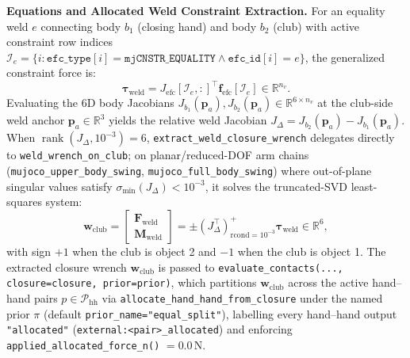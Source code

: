 \documentclass[11pt,a4paper]{article}
\newcommand{\R}{\mathbb{R}}
\begin{document}
\textbf{Equations and Allocated Weld Constraint Extraction.}
For an equality weld $e$ connecting body $b_1$ (closing hand) and body $b_2$ (club) with active constraint row indices $\mathcal{I}_e = \{i : \texttt{efc\_type}[i] = \texttt{mjCNSTR\_EQUALITY} \wedge \texttt{efc\_id}[i] = e\}$, the generalized constraint force is:
\begin{equation}
\boldsymbol{\tau}_{\mathrm{weld}} = J_{\mathrm{efc}}[\mathcal{I}_e,:]^{\top} \mathbf{f}_{\mathrm{efc}}[\mathcal{I}_e] \in \R^{n_v}.
\end{equation}
Evaluating the 6D body Jacobians $J_{b_1}(\mathbf{p}_a), J_{b_2}(\mathbf{p}_a) \in \R^{6 \times n_v}$ at the club-side weld anchor $\mathbf{p}_a \in \R^3$ yields the relative weld Jacobian $J_{\Delta} = J_{b_2}(\mathbf{p}_a) - J_{b_1}(\mathbf{p}_a)$. When $\operatorname{rank}(J_{\Delta}, 10^{-3}) = 6$, \texttt{extract\_weld\_closure\_wrench} delegates directly to \texttt{weld\_wrench\_on\_club}; on planar/reduced-DOF arm chains (\texttt{mujoco\_upper\_body\_swing}, \texttt{mujoco\_full\_body\_swing}) where out-of-plane singular values satisfy $\sigma_{\min}(J_{\Delta}) < 10^{-3}$, it solves the truncated-SVD least-squares system:
\begin{equation}
\mathbf{w}_{\mathrm{club}} = \begin{bmatrix} \mathbf{F}_{\mathrm{weld}} \\ \mathbf{M}_{\mathrm{weld}} \end{bmatrix} = \pm \left(J_{\Delta}^{\top}\right)^{+}_{\mathrm{rcond}=10^{-3}} \boldsymbol{\tau}_{\mathrm{weld}} \in \R^6,
\end{equation}
with sign $+1$ when the club is object 2 and $-1$ when the club is object 1. The extracted closure wrench $\mathbf{w}_{\mathrm{club}}$ is passed to \texttt{evaluate\_contacts(..., closure=closure, prior=prior)}, which partitions $\mathbf{w}_{\mathrm{club}}$ across the active hand--hand pairs $p \in \mathcal{P}_{\mathrm{hh}}$ via \texttt{allocate\_hand\_hand\_from\_closure} under the named prior $\pi$ (default \texttt{prior\_name="equal\_split"}), labelling every hand--hand output \texttt{"allocated"} (\texttt{external:<pair>\_allocated}) and enforcing \texttt{applied\_allocated\_force\_n()} $= 0.0\,\mathrm{N}$.
\end{document}
